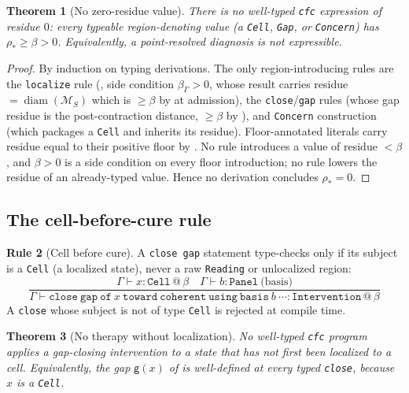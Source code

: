 \documentclass[11pt,a4paper]{article}
\theoremstyle{cfcthm}
\newtheorem{theorem}{Theorem}[section]
\theoremstyle{definition}
\newtheorem{rulename}[theorem]{Rule}
\theoremstyle{remark}
\newcommand{\Man}{\mathcal{M}}          %
\newcommand{\st}{x}                     %
\newcommand{\flo}{\beta}                %
\newcommand{\Rd}{\rho}                  %
\newcommand{\gap}{\mathsf{g}}           %
\newcommand{\diam}{\operatorname{diam}}
\newcommand{\cf}[1]{\texttt{#1}}
\begin{document}
\begin{theorem}[No zero-residue value]
\label{thm:no-zero}
There is no well-typed \cf{cfc} expression of residue $0$: every typeable
region-denoting value (a \cf{Cell}, \cf{Gap}, or \cf{Concern}) has
$\Rd_{\ast}\ge\flo>0$. Equivalently, a point-resolved diagnosis is not
expressible.
\end{theorem}

\begin{proof}
By induction on typing derivations. The only region-introducing rules are the
\cf{localize} rule (, side condition $\flo_\Gamma>0$,
whose result carries residue $=\diam(\Man_S)$ which is $\ge\flo$ by
 at admission), the \cf{close}/\cf{gap} rules (whose gap
residue is the post-contraction distance, $\ge\flo$ by ),
and \cf{Concern} construction (which packages a \cf{Cell} and inherits its
residue). Floor-annotated literals carry residue equal to their positive floor
by . No rule introduces a value of residue $<\flo$, and
$\flo>0$ is a side condition on every floor introduction; no rule lowers the
residue of an already-typed value. Hence no derivation concludes
$\Rd_{\ast}=0$.
\end{proof}

\subsection{The cell-before-cure rule}

\begin{rulename}[Cell before cure]
\label{rule:cell-first}
A \cf{close gap} statement type-checks only if its subject is a \cf{Cell}
(a localized state), never a raw \cf{Reading} or unlocalized region:
\[
\frac{\Gamma\vdash x:\cf{Cell}\,@\,\flo\quad\Gamma\vdash b:\cf{Panel}\ \text{(basis)}}
     {\Gamma\vdash \cf{close}\ \cf{gap}\ \cf{of}\ x\ \cf{toward}\ \cf{coherent}\ \cf{using}\ \cf{basis}\ b\ \cdots:\cf{Intervention}\,@\,\flo}
\]
A \cf{close} whose subject is not of type \cf{Cell} is rejected at compile time.
\end{rulename}

\begin{theorem}[No therapy without localization]
\label{thm:no-blind-therapy}
No well-typed \cf{cfc} program applies a gap-closing intervention to a state
that has not first been localized to a cell. Equivalently, the gap
$\gap(\st)$ of  is well-defined at every typed \cf{close}, because
$\st$ is a \cf{Cell}.
\end{theorem}
\end{document}
